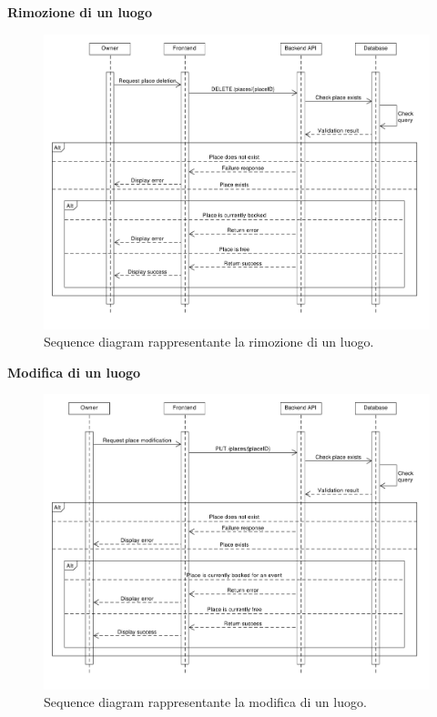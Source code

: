 \documentclass[9pt]{extarticle}
\begin{document}
\newpage

\textbf{Rimozione di un luogo}
\begin{figure}[!htb]
	\centering
	\includegraphics[width=\linewidth]{./images/SequenceDiagramPlaceDeletion.pdf}
	\caption{Sequence diagram rappresentante la rimozione di un luogo.}
	\label{fig:SeqDiagRemovePlace}
\end{figure}

\newpage


\textbf{Modifica di un luogo}
\begin{figure}[!htb]
	\centering
	\includegraphics[width=\linewidth]{./images/SequenceDiagramEditPlace.pdf}
	\caption{Sequence diagram rappresentante la modifica di un luogo.}
	\label{fig:SeqDiagEditPlace}
\end{figure}
\end{document}
